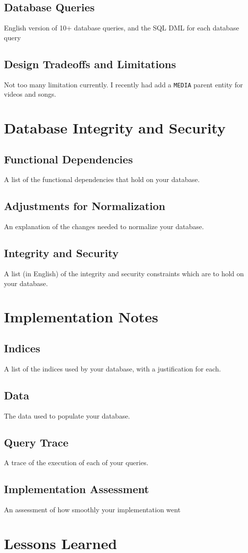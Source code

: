 \documentclass[11pt, a4paper]{report}
\begin{document}
\clearpage
\section{Database Queries}
    English version of 10+ database queries, and the SQL DML for each database query

\clearpage
\section{Design Tradeoffs and Limitations}
Not too many limitation currently. I recently had add a \texttt{MEDIA} parent entity for videos and songs.

\chapter{Database Integrity and Security}
\section{Functional Dependencies}
    A list of the functional dependencies that hold on your database.
\section{Adjustments for Normalization}
    An explanation of the changes needed to normalize your database.
\section{Integrity and Security}
    A list (in English) of the integrity and security constraints which are to hold on your database.

\chapter{Implementation Notes}
\section{Indices}
    A list of the indices used by your database, with a justification for each.
\section{Data}
    The data used to populate your database.
\section{Query Trace}
    A trace of the execution of each of your queries.
\section{Implementation Assessment}
    An assessment of how smoothly your implementation went

\chapter{Lessons Learned}
\end{document}
